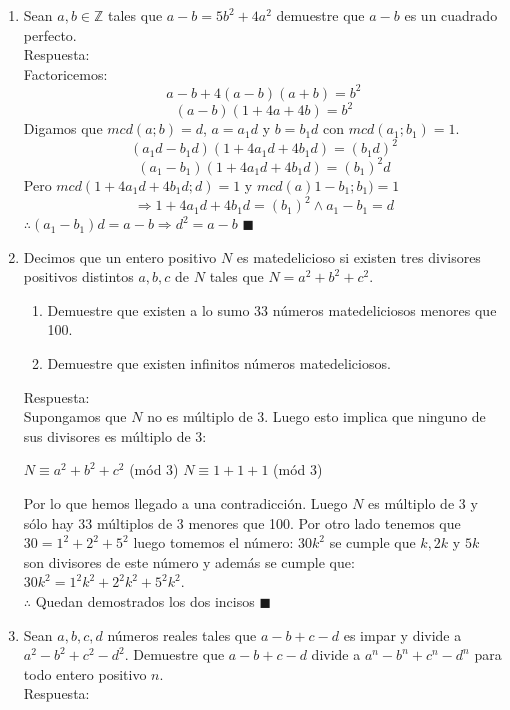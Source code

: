 \documentclass{book}
\newcommand{\Z}{\mathbb{Z}} \def\max{\mathop{\mbox{\rm máx}}} %
\begin{document}
\begin{enumerate}
          
    \item Sean $a,b\in \Z$ tales que $a-b=5b^2+4a^2$ demuestre que $a-b$ es un cuadrado perfecto.\\
          Respuesta:\\
          Factoricemos:
          $$a - b + 4(a - b)(a + b) = b^2$$
          $$(a-b)(1 + 4a + 4b) = b^2$$
          Digamos que $mcd(a;b) = d$, $a = a_1d$ y $b = b_1d$ con $mcd(a_1;b_1) = 1$.                    $$(a_1d - b_1d)(1 + 4a_1d + 4b_1d) = (b_1d)^2$$
          $$(a_1 - b_1)(1 + 4a_1d + 4b_1d) = (b_1)^2d$$
          Pero $mcd(1 + 4a_1d + 4b_1d;d) = 1$ y $mcd(a)1 - b_1;b_1) = 1$
          $$\Rightarrow 1 + 4a_1d + 4b_1d = (b_1)^2 \wedge a_1 - b_1 = d$$
          $\therefore (a_1 - b_1)d = a - b \Rightarrow d^2 = a - b$ $\blacksquare$ \\
    \item Decimos que un entero positivo $N$ es matedelicioso si existen tres divisores positivos distintos $a,b,c$ de $N$ tales que $N = a^2 + b^2 + c^2$.
          \begin{enumerate}
              \item Demuestre que existen a lo sumo 33 números matedeliciosos menores que 100.
              \item Demuestre que existen infinitos números matedeliciosos.
          \end{enumerate}
          Respuesta:\\
          Supongamos que $N$ no es múltiplo de 3. Luego esto implica que ninguno de sus divisores es múltiplo de 3:
          \begin{center}
              $N\equiv a^2 + b^2 + c^2$ (mód 3)
              $N\equiv  1 + 1 + 1$ (mód 3)
          \end{center}
          Por lo que hemos llegado a una contradicción. Luego $N$ es múltiplo de 3 y sólo hay 33 múltiplos de 3 menores que 100. Por otro lado tenemos que $30 = 1^2 + 2^2 + 5^2$ luego tomemos el número: $30k^2$ se cumple que $k,2k$ y $5k$ son divisores de este número y además se cumple que: $30k^2 = 1^2k^2 + 2^2k^2 + 5^2k^2$.\\
          $\therefore$ Quedan demostrados los dos incisos $\blacksquare$ \\
    \item Sean $a,b,c,d$ números reales tales que $a-b+c-d$ es impar y divide a $a^2-b^2+c^2-d^2$. Demuestre que
          $a-b+c-d$ divide a $a^n-b^n+c^n-d^n$ para todo entero positivo $n$.\\
          Respuesta:\\

\end{enumerate}
\end{document}
